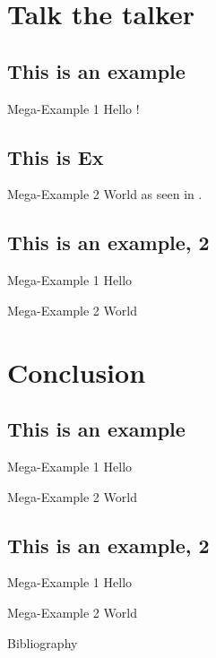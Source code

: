 \documentclass[aspectratio=169,usepdftitle=true,handout]{beamer}
\begin{document}
\section{Talk the talker}
\subsection{This is an example}

\begin{frame}{Mega-Example 1}
    Hello \cite{dirac}!
\end{frame}

\subsection{This is Ex}
\begin{frame}{Mega-Example 2}
    World as seen in \cite{einstein}.
\end{frame}

\subsection{This is an example, 2}

\begin{frame}{Mega-Example 1}
    Hello
\end{frame}

\begin{frame}{Mega-Example 2}
    World
\end{frame}


\section{Conclusion}
\subsection{This is an example}

\begin{frame}{Mega-Example 1}
    Hello
\end{frame}

\begin{frame}{Mega-Example 2}
    World
\end{frame}

\subsection{This is an example, 2}

\begin{frame}{Mega-Example 1}
    Hello
\end{frame}

\begin{frame}{Mega-Example 2}
    World
\end{frame}

\begin{frame}{Bibliography}
    \printBibCommand
\end{frame}
\end{document}
